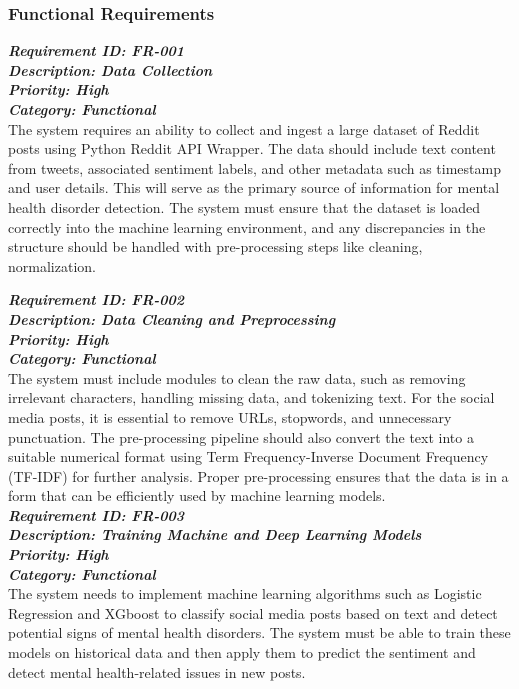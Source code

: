 \subsubsection{Functional Requirements}

\noindent
\textbf{\emph{Requirement ID: FR-001}} \\ 
\textbf{\emph{Description: Data Collection}} \\
\textbf{\emph{Priority: High}} \\
\textbf{\emph{Category: Functional}} \\
\noindent
The system requires an ability to collect and ingest a large dataset of Reddit posts using Python Reddit API Wrapper. The data should include text content from tweets, associated sentiment labels, and other metadata such as timestamp and user details. This will serve as the primary source of information for mental health disorder detection. The system must ensure that the dataset is loaded correctly into the machine learning environment, and any discrepancies in the structure should be handled with pre-processing steps like cleaning, normalization. \\

\pagebreak

\noindent
\textbf{\emph{Requirement ID: FR-002}} \\ 
\textbf{\emph{Description: Data Cleaning and Preprocessing}} \\
\textbf{\emph{Priority: High}} \\
\textbf{\emph{Category: Functional}} \\
\noindent
The system must include modules to clean the raw data, such as removing irrelevant characters, handling missing data, and tokenizing text. For the social media posts, it is essential to remove URLs, stopwords, and unnecessary punctuation. The pre-processing pipeline should also convert the text into a suitable numerical format using Term Frequency-Inverse Document Frequency (TF-IDF) for further analysis. Proper pre-processing ensures that the data is in a form that can be efficiently used by machine learning models. \\

\noindent
\textbf{\emph{Requirement ID: FR-003}} \\ 
\textbf{\emph{Description: Training Machine and Deep Learning Models}} \\
\textbf{\emph{Priority: High}} \\
\textbf{\emph{Category: Functional}} \\
\noindent
The system needs to implement machine learning algorithms such as Logistic Regression and XGboost to classify social media posts based on text and detect potential signs of mental health disorders. The system must be able to train these models on historical data and then apply them to predict the sentiment and detect mental health-related issues in new posts. \\

